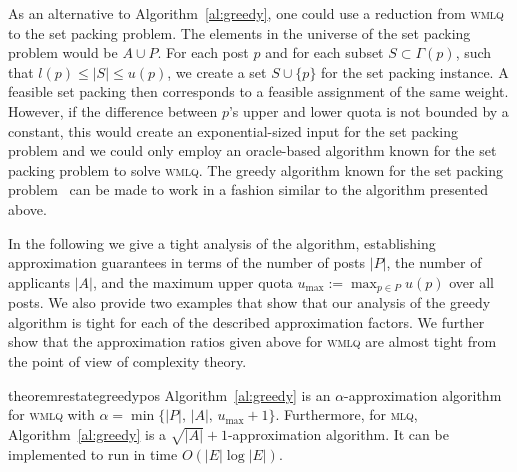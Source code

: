 \documentclass{llncs}
\begin{document}
\begin{remark}
As an alternative to Algorithm~\ref{al:greedy}, one could use a reduction from \textsc{wmlq} to the set packing problem. The elements in the universe of the set packing problem would be $A\cup P$. For each post $p$ and for each subset $S \subset \Gamma(p)$, such that $l(p) \le |S| \le u(p)$, we create a set $S \cup \{p\}$ for the set packing instance. A feasible set packing then corresponds to a feasible assignment of the same weight. However, if the difference between $p$'s upper and lower quota is not bounded by a constant, this would create an exponential-sized input for the set packing problem and we could only employ an oracle-based algorithm known for the set packing problem to solve \textsc{wmlq}. The greedy algorithm known for the set packing problem~\cite{CH01} can be made to work in a fashion similar to the algorithm presented above.
\end{remark}

In the following we give a tight analysis of the algorithm, establishing approximation guarantees in terms of the number of posts $|P|$, the number of applicants $|A|$, and the maximum upper quota $u_{\max} := \max_{p \in P} u(p)$ over all posts. We also provide two examples that show that our analysis of the greedy algorithm is tight for each of the described approximation factors. We further show that the approximation ratios given above for \textsc{wmlq} are almost tight from the point of view of complexity theory.

\begin{restatable}{theorem}{restategreedypos}\label{thm:greedy-approximation}
  Algorithm~\ref{al:greedy} is an $\alpha$-approximation algorithm for \textsc{wmlq} with \linebreak \mbox{$\alpha = \min \{|P|,\, |A|,\, u_{\max} + 1\}$}. Furthermore, for \textsc{mlq}, Algorithm~\ref{al:greedy} is a $\sqrt{|A|} + 1$-approximation algorithm. It can be implemented to run in time $O(|E| \log |E|)$.
\end{restatable}
\end{document}
